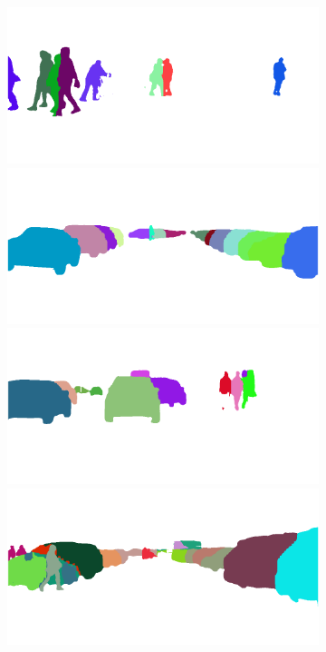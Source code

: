 \begin{figure}[p]
{{\begin{subfigure}[t]{0.24\linewidth}
\begin{center}
		\includegraphics[width=\linewidth,trim={0px 60px 0 0px},clip]{results/segnet_114_output_3.png}
		\includegraphics[width=\linewidth,trim={0px 60px 0 0px},clip]{results/segnet_86_output_3.png}
		\includegraphics[width=\linewidth,trim={0px 60px 0 0px},clip]{results/segnet_51_output_3.png}
		\includegraphics[width=\linewidth,trim={0px 60px 0 0px},clip]{results/segnet_45_output_3.png}

\end{center}
\end{subfigure}}}
\end{figure}
